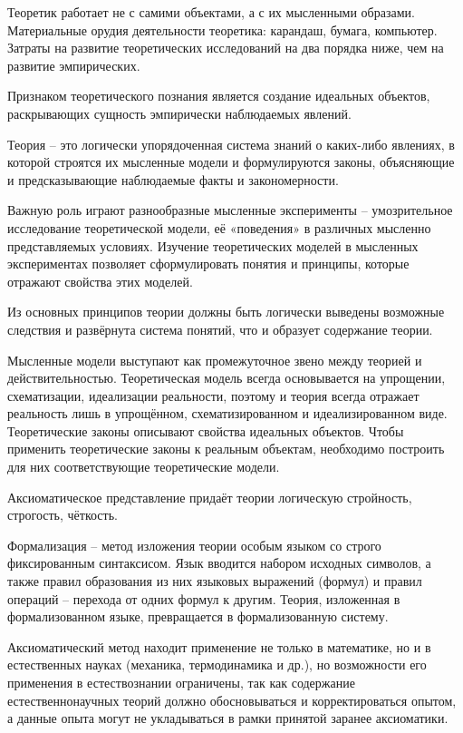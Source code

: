 \documentclass[exam_answers.tex]{subfiles}
\begin{document}
\renewcommand{\baselinestretch}{\blch}

Теоретик работает не с самими объектами, а с их мысленными образами.
Материальные орудия деятельности теоретика: карандаш, бумага, компьютер.
Затраты на развитие теоретических исследований на два порядка ниже, чем на развитие эмпирических.

Признаком теоретического познания является создание идеальных объектов, раскрывающих сущность эмпирически наблюдаемых явлений.

Теория – это логически упорядоченная система знаний о каких-либо явлениях, в которой строятся их мысленные модели и формулируются законы, объясняющие и предсказывающие наблюдаемые факты и закономерности.

Важную роль играют разнообразные мысленные эксперименты – умозрительное исследование теоретической модели, её «поведения» в различных мысленно представляемых условиях.
Изучение теоретических моделей в мысленных экспериментах позволяет сформулировать понятия и принципы, которые отражают свойства этих моделей.

Из основных принципов теории должны быть логически выведены возможные следствия и развёрнута система понятий, что и образует содержание теории.

Мысленные модели выступают как промежуточное звено между теорией и действительностью.
Теоретическая модель всегда основывается на упрощении, схематизации, идеализации реальности, поэтому и теория всегда отражает реальность лишь в упрощённом, схематизированном и идеализированном виде.
Теоретические законы описывают свойства идеальных объектов.
Чтобы применить теоретические законы к реальным объектам, необходимо построить для них соответствующие теоретические модели.

Аксиоматическое представление придаёт теории логическую стройность, строгость, чёткость.

Формализация – метод изложения теории особым языком со строго фиксированным синтаксисом.
Язык вводится набором исходных символов, а также правил образования из них языковых выражений (формул) и правил операций – перехода от одних формул к другим.
Теория, изложенная в формализованном языке, превращается в формализованную систему.

Аксиоматический метод находит применение не только в математике, но и в естественных науках (механика, термодинамика и др.), но возможности его применения в естествознании ограничены, так как содержание естественнонаучных теорий должно обосновываться и корректироваться опытом, а данные опыта могут не укладываться в рамки принятой заранее аксиоматики.
\end{document}
